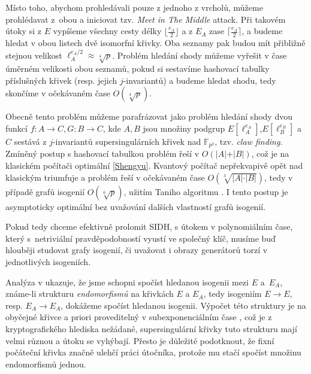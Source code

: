 \documentclass[12pt]{report}
\begin{document}
Místo toho, abychom prohledávali pouze z jednoho z vrcholů, můžeme prohlédavat z~obou a iniciovat tzv. \textit{Meet in The Middle} attack. Při takovém útoky si z $E$ vypíšeme všechny cesty délky $\lfloor \frac{e_A}{2} \rfloor$ a z $E_A$ zase $\lceil \frac{e_A}{2} \rceil$, a budeme hledat v obou listech dvě isomorfní křivky. Oba seznamy pak budou mít přibližně stejnou velikost $\ell_A ^ {e_A/2} \approx \sqrt[4]{p}$. Problém hledání shody můžeme vyřešit v čase úměrném velikosti obou seznamů, pokud si sestavíme hashovací tabulky příslušných křivek (resp. jejich $j$-invariantů) a budeme hledat shodu, tedy skončíme v očekávaném čase $O(\sqrt[4]{p})$.

Obecně tento problém můžeme parafrázovat jako problém hledání shody dvou funkcí $f : A \longrightarrow C, G : B \longrightarrow C$, kde $A,B$ jsou množiny podgrup $E[\ell_A ^{e_A}]$,$E[\ell_B ^{e_B}]$ a $C$ sestává z $j$-invariantů supersingulárních křivek nad $\mathbb{F}_{p^2}$, tzv. \textit{claw finding}. Zmíněný postup s hashovací tabulkou problém řeší v $O(\vert A\vert + \vert B \vert)$, což je na klasickém počítači optimální \ref{Shengyu}. Kvantový počítač nepřekvapivě opět nad klasickým triumfuje a problém řeší v očekávaném čase $O( \sqrt[3]{\vert A \vert \cdot \vert B \vert})$, tedy v případě grafů isogenií $O(\sqrt[6]{p})$, užitím Taniho algoritmu \cite{Tani}. I tento postup je asymptoticky optimální bez uvažování dalších vlastností grafů isogenií. 

Pokud tedy chceme efektivně prolomit SIDH, s útokem v polynomiálním čase, který s~netriviální pravděpodobností vyustí ve společný klíč, musíme buď hlouběji studovat grafy isogenií, či uvažovat i obrazy generátorů torzí v jednotlivých isogeniích.

Analýza v \cite[Sec. 4.2]{Galbraith4} ukazuje, že jsme schopni spočíst hledanou isogenii mezi $E$ a~$E_A$, známe-li strukturu \textit{endomorfismů} na křivkách $E$ a $E_A$, tedy isogeniím $E \longrightarrow E$, resp. $E_A \longrightarrow E_A$, dokážeme spočíst hledanou isogenii. Výpočet této struktury je na obyčejné křivce a priori proveditelný v subexponenciálním čase \cite{Bisson}, což je z kryptografického hlediska nežádané, supersingulární křivky tuto strukturu mají velmi různou a útoku se vyhýbají. Přesto je důležité podotknout, že fixní počáteční křivka značně ulehčí práci útočníka, protože mu stačí spočíst množinu endomorfismů jednou.
\end{document}
